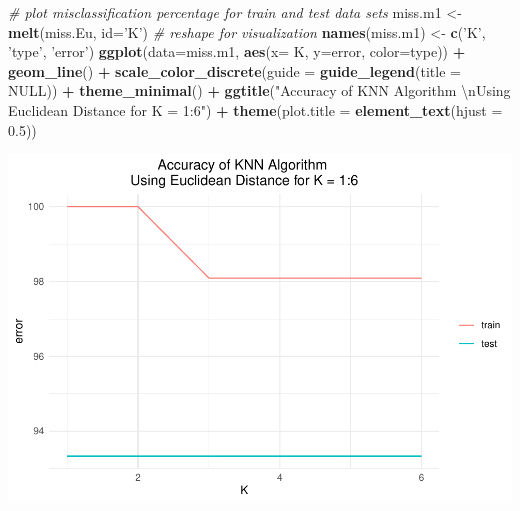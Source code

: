 \documentclass[
]{article}
\newenvironment{Shaded}{\begin{snugshade}}{\end{snugshade}}
\newcommand{\CharTok}[1]{\textcolor[rgb]{0.31,0.60,0.02}{#1}}
\newcommand{\CommentTok}[1]{\textcolor[rgb]{0.56,0.35,0.01}{\textit{#1}}}
\newcommand{\DataTypeTok}[1]{\textcolor[rgb]{0.13,0.29,0.53}{#1}}
\newcommand{\FloatTok}[1]{\textcolor[rgb]{0.00,0.00,0.81}{#1}}
\newcommand{\KeywordTok}[1]{\textcolor[rgb]{0.13,0.29,0.53}{\textbf{#1}}}
\newcommand{\NormalTok}[1]{#1}
\newcommand{\OperatorTok}[1]{\textcolor[rgb]{0.81,0.36,0.00}{\textbf{#1}}}
\newcommand{\OtherTok}[1]{\textcolor[rgb]{0.56,0.35,0.01}{#1}}
\newcommand{\StringTok}[1]{\textcolor[rgb]{0.31,0.60,0.02}{#1}}
\begin{document}
\begin{Shaded}
\begin{Highlighting}[]
\CommentTok{# plot misclassification percentage for train and test data sets}
\NormalTok{miss.m1 <-}\StringTok{ }\KeywordTok{melt}\NormalTok{(miss.Eu, }\DataTypeTok{id=}\StringTok{'K'}\NormalTok{) }\CommentTok{# reshape for visualization}
\KeywordTok{names}\NormalTok{(miss.m1) <-}\StringTok{ }\KeywordTok{c}\NormalTok{(}\StringTok{'K'}\NormalTok{, }\StringTok{'type'}\NormalTok{, }\StringTok{'error'}\NormalTok{)}
\KeywordTok{ggplot}\NormalTok{(}\DataTypeTok{data=}\NormalTok{miss.m1, }\KeywordTok{aes}\NormalTok{(}\DataTypeTok{x=}\NormalTok{ K, }\DataTypeTok{y=}\NormalTok{error, }\DataTypeTok{color=}\NormalTok{type)) }\OperatorTok{+}\StringTok{ }\KeywordTok{geom_line}\NormalTok{() }\OperatorTok{+}
\StringTok{       }\KeywordTok{scale_color_discrete}\NormalTok{(}\DataTypeTok{guide =} \KeywordTok{guide_legend}\NormalTok{(}\DataTypeTok{title =} \OtherTok{NULL}\NormalTok{)) }\OperatorTok{+}\StringTok{ }\KeywordTok{theme_minimal}\NormalTok{() }\OperatorTok{+}
\StringTok{       }\KeywordTok{ggtitle}\NormalTok{(}\StringTok{"Accuracy of KNN Algorithm }\CharTok{\textbackslash{}n}\StringTok{Using Euclidean Distance for K = 1:6"}\NormalTok{) }\OperatorTok{+}\StringTok{ }\KeywordTok{theme}\NormalTok{(}\DataTypeTok{plot.title =} \KeywordTok{element_text}\NormalTok{(}\DataTypeTok{hjust =} \FloatTok{0.5}\NormalTok{))}
\end{Highlighting}
\end{Shaded}

\includegraphics{assessment-1_files/figure-latex/unnamed-chunk-8-1.pdf}
\end{document}
